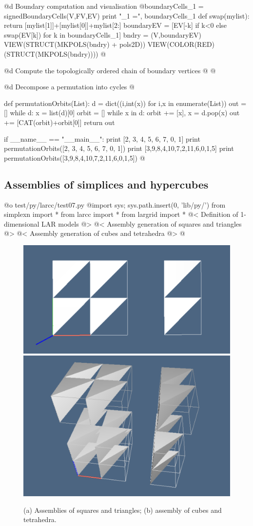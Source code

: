 \documentclass[11pt,oneside]{article}	%
\begin{document}
@d Boundary computation and visualisation 
@{boundaryCells_1 = signedBoundaryCells(V,FV,EV)
print "\nboundaryCells_1 =\n", boundaryCells_1
def swap(mylist): return [mylist[1]]+[mylist[0]]+mylist[2:]
boundaryEV = [EV[-k] if k<0 else swap(EV[k]) for k in boundaryCells_1]
bndry = (V,boundaryEV)
VIEW(STRUCT(MKPOLS(bndry) + pols2D))
VIEW(COLOR(RED)(STRUCT(MKPOLS(bndry))))
@}

@d Compute the topologically ordered chain of boundary vertices
@{
@}

@d Decompose a permutation into cycles 
@{def permutationOrbits(List):
	d = dict((i,int(x)) for i,x in enumerate(List))
	out = []
	while d:
		x = list(d)[0]
		orbit = []
		while x in d:
			orbit += [x],
			x = d.pop(x)
		out += [CAT(orbit)+orbit[0]]
	return out
		
if __name__ == "__main__":
	print [2, 3, 4, 5, 6, 7, 0, 1]
	print permutationOrbits([2, 3, 4, 5, 6, 7, 0, 1])
	print [3,9,8,4,10,7,2,11,6,0,1,5]
	print permutationOrbits([3,9,8,4,10,7,2,11,6,0,1,5])
@}

\subsection{Assemblies of simplices and hypercubes}

@o test/py/larcc/test07.py
@{import sys; sys.path.insert(0, 'lib/py/')
from simplexn import *
from larcc import *
from largrid import *
@< Definition of 1-dimensional LAR models @>
@< Assembly generation of squares and triangles @>
@< Assembly generation  of cubes and tetrahedra @>
@}

\begin{figure}[htbp] %
   \centering
   \includegraphics[width=0.405\linewidth]{images/assembly1} 
   \includegraphics[width=0.315\linewidth]{images/assembly2} 
   \caption{(a) Assemblies of squares and triangles; (b) assembly of cubes and tetrahedra.}
   \label{fig:example}
\end{figure}
\end{document}
